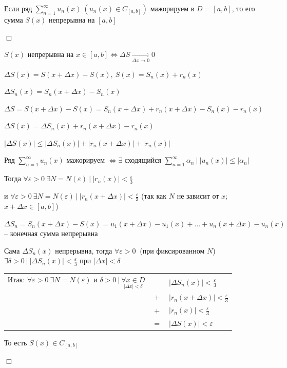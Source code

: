 \documentclass[12pt]{article}
\begin{document}
    \hypertarget{functionalsumcontinuity}{}

    \begin{MyTheorem}
        \Ths Если ряд $\sum_{n = 1}^\infty u_n(x) \ (u_n(x) \in C_{[a, b]})$ мажорируем в $D = [a, b]$, то 
        его сумма $S(x)$ непрерывна на $[a, b]$
    \end{MyTheorem}

    \begin{MyProof}
        $\Box$

        $S(x)$ непрерывна на $x \in [a, b] \Longleftrightarrow \Delta S \underset{\Delta x \to 0}{\rightarrow} 0$

        $\Delta S(x) = S(x + \Delta x) - S(x), \ S(x) = S_n(x) + r_n(x)$

        $\Delta S_n(x) = S_n(x + \Delta x) - S_n(x)$

        $\Delta S = S(x + \Delta x) - S(x) = S_n(x + \Delta x) + r_n(x +  \Delta x) - S_n(x) - r_n(x)$

        $\Delta S(x) = \Delta S_n(x) + r_n(x + \Delta x) - r_n(x)$

        $|\Delta S(x)| \leq |\Delta S_n(x)| + |r_n(x + \Delta x)| + |r_n(x)|$

        Ряд $\sum_{n = 1}^\infty u_n(x)$ мажорируем $\Longleftrightarrow \exists$ сходящийся $\sum_{n = 1}^\infty \alpha_n \ \Big| \ |u_n(x)| \leq |\alpha_n|$
    
        Тогда $\forall \varepsilon > 0 \ \exists N = N(\varepsilon) \ | \ |r_n(x)| < \frac{\varepsilon}{3}$

        и $\forall \varepsilon > 0 \ \exists N = N(\varepsilon) \ | \ |r_n(x + \Delta x)| < \frac{\varepsilon}{3}$ (так как $N$ не зависит от $x$; $x + \Delta x \in [a, b]$) 
    
        $\Delta S_n = S_n(x + \Delta x) - S(x) = u_1(x + \Delta x) - u_1(x) + \dots + u_n(x + \Delta x) - u_n(x)$ -- конечная сумма непрерывна

        Сама $\Delta S_n(x)$ непрерывна, тогда $\forall \varepsilon > 0 \ $ (при фиксированном $N$) $\exists \delta > 0 \ | \ |\Delta S_n(x)| < \frac{\varepsilon}{3}$ при $|\Delta x| < \delta$

        \bgroup
        \setlength\tabcolsep{1.5pt}
        \begin{tabular}{ccl}
            Итак: $\forall \varepsilon > 0 \ \exists N = N(\varepsilon)$ и $\delta > 0 \ | \ \underset{|\Delta x| < \delta}{\forall x \in D}$ & & $|\Delta S_n(x)| < \frac{\varepsilon}{3}$ \\
            
            & $+$ & $|r_n(x + \Delta x)| < \frac{\varepsilon}{3}$ \\ 
            
            & $+$ & $|r_n(x)| < \frac{\varepsilon}{3}$ \\

            & $=$ & $|\Delta S(x)| < \varepsilon$
        \end{tabular}
        \egroup

        То есть $S(x) \in C_{[a, b]}$

        $\Box$
    \end{MyProof}
\end{document}
